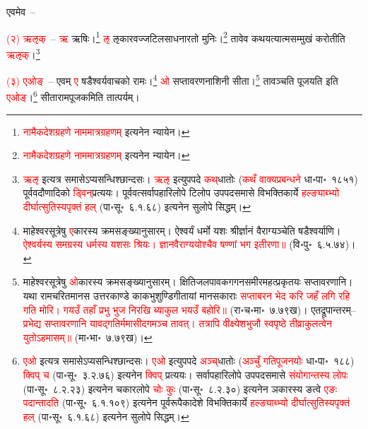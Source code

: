 \begin{sloppypar}\justifying\noindent\hspace{10mm} एवमेव~–\end{sloppypar}
\begin{sloppypar}\justifying\noindent\hspace{10mm} \textcolor{red}{(२) ऋऌक्}~– \textcolor{red}{ऋ} ऋषिः।\footnote{\textcolor{red}{नामैकदेशग्रहणे नाममात्रग्रहणम्} इत्यनेन न्यायेन।} \textcolor{red}{ऌ} ऌकारवज्जटिल\-साधना\-रतो मुनिः।\footnote{\textcolor{red}{नामैकदेशग्रहणे नाममात्रग्रहणम्} इत्यनेन न्यायेन।} तावेव कथयत्यात्म\-सम्मुखं करोतीति \textcolor{red}{ऋऌक्}।\footnote{\textcolor{red}{ऋऌ} इत्यत्र समासेऽप्यसन्धिश्छान्दसः। \textcolor{red}{ऋऌ} इत्युपपदे \textcolor{red}{कथ्‌}\-धातोः (\textcolor{red}{कथँ वाक्य\-प्रबन्धने} धा॰पा॰~१८५१) पूर्ववदौणादिको \textcolor{red}{ड्विन्‌}प्रत्ययः। पूर्ववत्सर्वापहारि\-लोपे टिलोप उपपद\-समासे विभक्तिकार्ये \textcolor{red}{हल्ङ्याब्भ्यो दीर्घात्सुतिस्यपृक्तं हल्} (पा॰सू॰~६.१.६८) इत्यनेन सुलोपे सिद्धम्।}\end{sloppypar}
\begin{sloppypar}\justifying\noindent\hspace{10mm} \textcolor{red}{(३) एओङ्}~– एवम् \textcolor{red}{ए} षडैश्वर्य\-वाचको रामः।\footnote{माहेश्वर\-सूत्रेषु \textcolor{red}{ए}\-कारस्य क्रमसङ्ख्यानुसारम्। ऐश्वर्यं धर्मो यशः श्रीर्ज्ञानं वैराग्यञ्चेति षडैश्वर्याणि। \textcolor{red}{ऐश्वर्यस्य समग्रस्य धर्मस्य यशसः श्रियः। ज्ञानवैराग्ययोश्चैव षण्णां भग इतीरणा॥} (वि॰पु॰~६.५.७४)।} \textcolor{red}{ओ} सप्तावरण\-नाशिनी सीता।\footnote{माहेश्वर\-सूत्रेषु \textcolor{red}{ओ}\-कारस्य क्रमसङ्ख्यानुसारम्। क्षिति\-जल\-पावक\-गगन\-समीर\-महत्प्रकृतयः सप्तावरणानि। यथा रामचरितमानस उत्तरकाण्डे काकभुशुण्डि\-गीतायां मानसकाराः \textcolor{red}{सप्ताबरन भेद करि जहँ लगि रहि गति मोरि। गयउँ तहाँ प्रभु भुज निरखि ब्याकुल भयउँ बहोरि॥} (रा॰च॰मा॰~७.७९ख)। एतद्रूपान्तरम्–\textcolor{red}{प्रभेद्य सप्तावरणानि यावद्गतिर्ममासीदगमञ्च तावत्। तत्रापि वीक्ष्येशभुजौ स्वपृष्ठे तीव्राकुलत्वेन युतोऽहमासम्॥} (मा॰भा॰~७.७९ख)।} तावञ्चति पूजयति इति \textcolor{red}{एओङ्}।\footnote{\textcolor{red}{एओ} इत्यत्र समासेऽप्यसन्धिश्छान्दसः। \textcolor{red}{एओ} इत्युपपदे \textcolor{red}{अञ्च्‌}\-धातोः (\textcolor{red}{अञ्चुँ गतिपूजनयोः} धा॰पा॰~१८८) \textcolor{red}{क्विप् च} (पा॰सू॰~३.२.७६) इत्यनेन \textcolor{red}{क्विप्} प्रत्ययः। सर्वापहारि\-लोपे उपपद\-समासे \textcolor{red}{संयोगान्तस्य लोपः} (पा॰सू॰~८.२.२३) इत्यनेन चकार\-लोपे \textcolor{red}{चोः कुः} (पा॰सू॰~८.२.३०) इत्यनेन ञकारस्य ङत्वे \textcolor{red}{एङः पदान्तादति} (पा॰सू॰~६.१.१०९) इत्यनेन पूर्वरूपैकादेशे विभक्तिकार्ये \textcolor{red}{हल्ङ्याब्भ्यो दीर्घात्सुतिस्यपृक्तं हल्} (पा॰सू॰~६.१.६८) इत्यनेन सुलोपे सिद्धम्।} सीता\-राम\-पूजकमिति तात्पर्यम्।\end{sloppypar}
